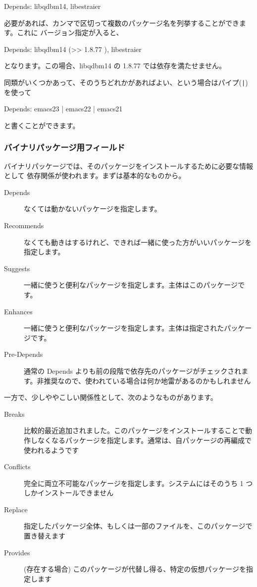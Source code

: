 \documentclass[mingoth,a4paper]{jsarticle}
\begin{document}
\begin{commandline}
Depends: libqdbm14, libestraier
\end{commandline}

必要があれば、カンマで区切って複数のパッケージ名を列挙することができます。これに
バージョン指定が入ると、

\begin{commandline}
Depends: libqdbm14 (>> 1.8.77 ), libestraier
\end{commandline}

となります。この場合、libqdbm14 の 1.8.77 では依存を満たせません。

同類がいくつかあって、そのうちどれかがあればよい、という場合はパイプ(\verb+|+)を使って

\begin{commandline}
Depends: emacs23 | emacs22 | emacs21
\end{commandline}

と書くことができます。

\subsubsection{バイナリパッケージ用フィールド}

バイナリパッケージでは、そのパッケージをインストールするために必要な情報として
依存関係が使われます。まずは基本的なものから。

\begin{description}
\item[Depends] なくては動かないパッケージを指定します。
\item[Recommends] なくても動きはするけれど、できれば一緒に使った方がいいパッケージを指定します。
\item[Suggests] 一緒に使うと便利なパッケージを指定します。主体はこのパッケージです。
\item[Enhances] 一緒に使うと便利なパッケージを指定します。主体は指定されたパッケージです。
\item[Pre-Depends] 通常の Depends よりも前の段階で依存先のパッケージがチェックされます。非推奨なので、使われている場合は何か地雷があるのかもしれません
\end{description}

一方で、少しややこしい関係性として、次のようなものがあります。

\begin{description}
\item[Breaks] 比較的最近追加されました。このパッケージをインストールすることで動作しなくなるパッケージを指定します。通常は、自パッケージの再編成で使われるようです
\item[Conflicts]完全に両立不可能なパッケージを指定します。システムにはそのうち 1 つしかインストールできません
\item[Replace] 指定したパッケージ全体、もしくは一部のファイルを、このパッケージで置き替えます
\item[Provides] (存在する場合) このパッケージが代替し得る、特定の仮想パッケージを指定します
\end{description}
\end{document}
